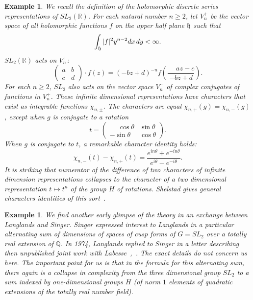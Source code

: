 \documentclass[brochure,english,12pt]{bourbaki}
\newtheorem{example}[equation]{Example}
\newcommand{\ring}[1]{\mathbb{#1}}
\begin{document}
\begin{example}\label{ex:sl2}  We recall the definition of the holomorphic discrete series representations
of $SL_2(\ring{R})$.  For each natural number $n\ge 2$, let $V^+_n$ be the vector space
of all holomorphic functions $f$ on the upper half plane ${\frak h}$ such that
\[
\int_{\frak h} |f|^2 y^{n-2} dx\, dy < \infty.
\]
$SL_2(\ring{R})$ acts on $V^+_n$:
\[
\begin{pmatrix} a & b \\ c & d \end{pmatrix} \cdot f(z) = 
(-b z + d ) ^{-n} f (\frac{\phantom{-}a z - c}{-b z + d}).
\]
For each $n\ge 2$, $SL_2$ also acts on the vector space $V^-_n$ of
complex conjugates of functions in $V^+_n$.  These infinite
dimensional representations have characters that exist as integrable
functions $\chi_{n,\pm}$.  The characters are equal
$\chi_{n,+}(g)=\chi_{n,-}(g)$, except when $g$ is conjugate to a
rotation
\[
t = \begin{pmatrix} \phantom{-}\cos\theta & \sin\theta \\ -\sin\theta & \cos\theta\end{pmatrix}.
\] 
When $g$ is conjugate to $t$, a remarkable character identity holds:
\[
\chi_{n,-}(t) - \chi_{n,+}(t) = 
\frac{e^{i n \theta} + e^{- i n \theta}}{e^{i\theta}-e^{-i\theta}}.
\]
It is striking that numerator of the difference of two characters of
infinite dimension representations collapses to the character of a two
dimensional representation $t\mapsto t^n$ of the group $H$ of
rotations.  Shelstad gives general characters identities of this
sort~\cite{XX}. %
\end{example}

\begin{example}\label{ex:singer}
  We find another early glimpse of the theory in an exchange
  between Langlands and Singer.  Singer expressed interest to
  Langlands in a particular alternating sum of dimensions of spaces of
  cusp forms of $G=SL_2$ over a totally real extension of
  $\ring{Q}$.  In 1974, Langlands replied to Singer in a letter
  describing then unpublished joint work with
  Labesse~\cite{XX},~\cite{XX}.  The exact details do not concern
  us here.  The important point for us is that in the formula for this
  alternating sum, there again is a collapse in complexity from the
  three dimensional group $SL_2$ to a sum indexed by one-dimensional
  groups $H$ (of norm $1$ elements of quadratic extensions of the totally real number field).
\end{example}
\end{document}
